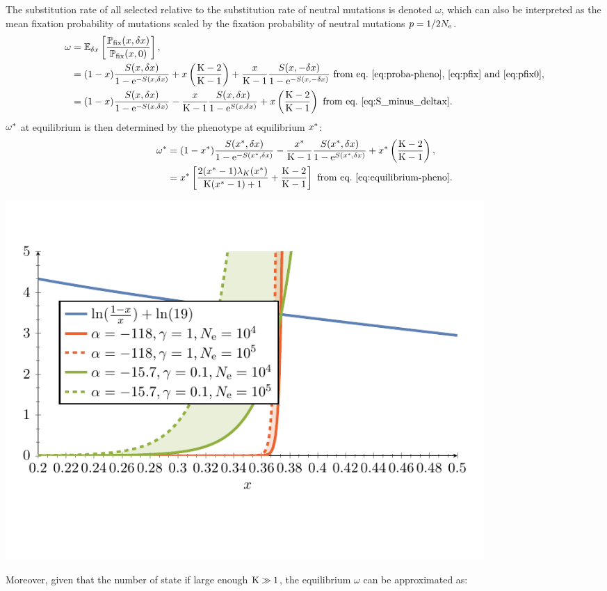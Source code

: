 The substitution rate of all selected relative to the substitution rate of neutral mutations is denoted $\omega$, which can also be interpreted as the mean fixation probability of mutations scaled by the fixation probability of neutral mutations $p = 1 / {2 N_{\text{e}}}$.
\begin{align}
    \omega & = \operatorname{\mathbb{E}}_{\delta x} \left[ \frac{\mathbb{P}_{\text{fix}}(x, \delta x)}{\mathbb{P}_{\text{fix}}(x, 0)} \right], \\
    & = (1 - x) \frac{ S(x, \delta x)}{1 - \text{e}^{-S(x, \delta x)}} + x \left(\frac{\text{K} - 2}{\text{K} - 1}\right) + \frac{x}{\text{K}-1} \frac{ S(x, -\delta x)}{1 - \text{e}^{-S(x, -\delta x)}} \text{ from eq.~\ref{eq:proba-pheno},~\ref{eq:pfix} and~\ref{eq:pfix0}}, \\
    & = (1 - x) \frac{ S(x, \delta x)}{1 - \text{e}^{-S(x, \delta x)}} - \frac{x}{\text{K}-1}  \frac{ S(x, \delta x)}{1 - \text{e}^{S(x, \delta x)}} + x \left(\frac{\text{K} - 2}{\text{K} - 1}\right) \text{ from eq.~\ref{eq:S_minus_deltax}}.
\end{align}
$\omega^{*}$ at equilibrium is then determined by the phenotype at equilibrium $x^{*}$:
\begin{align}
    \omega^{*} &= (1 - x^{*}) \frac{ S(x^{*}, \delta x)}{1 - \text{e}^{-S(x^{*}, \delta x)}} - \frac{x^{*}}{\text{K}-1} \frac{ S(x^{*}, \delta x)}{1 - \text{e}^{S(x^{*}, \delta x)}} + x^{*} \left(\frac{\text{K} - 2}{\text{K} - 1}\right) , \\
    &= x^{*} \left[ \frac{2 (x^{*}-1)  \lambda_{K}(x^{*}) }{\text{K} (x^{*}-1)+1} + \frac{\text{K} - 2}{\text{K} - 1}\right] \text{ from eq.~\ref{eq:equilibrium-pheno}}.
\end{align}
\begin{center}
    \includegraphics[width=0.8\textwidth, page=2] {analytical-relaxation}
\end{center}
Moreover, given that the number of state if large enough $\text{K} \gg 1$, the equilibrium $\omega$ can be approximated as:
